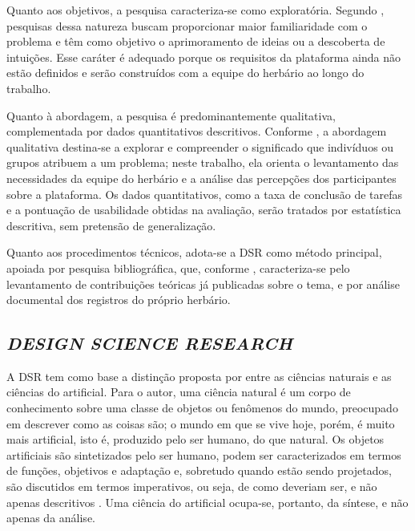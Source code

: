 \documentclass[
    12pt,        %
    openany,     %
    oneside,     %
    a4paper,     %
    english,     %
    french,      %
    spanish,     %
    brazil,      %
    article      %
]{abntex2}
\begin{document}
Quanto aos objetivos, a pesquisa caracteriza-se como exploratória. Segundo , pesquisas dessa natureza buscam proporcionar maior familiaridade com o problema e têm como objetivo o aprimoramento de ideias ou a descoberta de intuições. Esse caráter é adequado porque os requisitos da plataforma ainda não estão definidos e serão construídos com a equipe do herbário ao longo do trabalho.

Quanto à abordagem, a pesquisa é predominantemente qualitativa, complementada por dados quantitativos descritivos. Conforme , a abordagem qualitativa destina-se a explorar e compreender o significado que indivíduos ou grupos atribuem a um problema; neste trabalho, ela orienta o levantamento das necessidades da equipe do herbário e a análise das percepções dos participantes sobre a plataforma. Os dados quantitativos, como a taxa de conclusão de tarefas e a pontuação de usabilidade obtidas na avaliação, serão tratados por estatística descritiva, sem pretensão de generalização.

Quanto aos procedimentos técnicos, adota-se a DSR como método principal, apoiada por pesquisa bibliográfica, que, conforme , caracteriza-se pelo levantamento de contribuições teóricas já publicadas sobre o tema, e por análise documental dos registros do próprio herbário.

\subsection{\textit{DESIGN SCIENCE RESEARCH}}
\label{subsec:dsr}

A DSR tem como base a distinção proposta por  entre as ciências naturais e as ciências do artificial. Para o autor, uma ciência natural é um corpo de conhecimento sobre uma classe de objetos ou fenômenos do mundo, preocupado em descrever como as coisas são; o mundo em que se vive hoje, porém, é muito mais artificial, isto é, produzido pelo ser humano, do que natural. Os objetos artificiais são sintetizados pelo ser humano, podem ser caracterizados em termos de funções, objetivos e adaptação e, sobretudo quando estão sendo projetados, são discutidos em termos imperativos, ou seja, de como deveriam ser, e não apenas descritivos \cite{simon1996}. Uma ciência do artificial ocupa-se, portanto, da síntese, e não apenas da análise.
\end{document}
